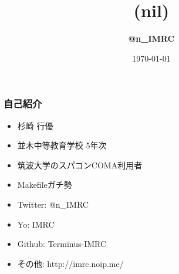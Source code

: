 \documentclass[dvipdfmx,20pt,notheorems,t]{beamer}
\title[(nil)]{(nil)}
\author[@n\_IMRC]{\textbf{@n\_IMRC}}
\institute[Namiki Secondary School]{並木中等教育学校}
\date{\today}
\begin{document}
\begin{frame}[plain]\frametitle{}
\titlepage
\end{frame}

\begin{frame}\frametitle{自己紹介}
\begin{itemize}
\item 杉崎 行優
\item 並木中等教育学校 5年次
\item 筑波大学のスパコンCOMA利用者
\item Makefileガチ勢
\item Twitter: @n\_IMRC
\item Yo: IMRC
\item Github: Terminus-IMRC
\item その他: http://imrc.noip.me/
\end{itemize}
\end{frame}
\end{document}
